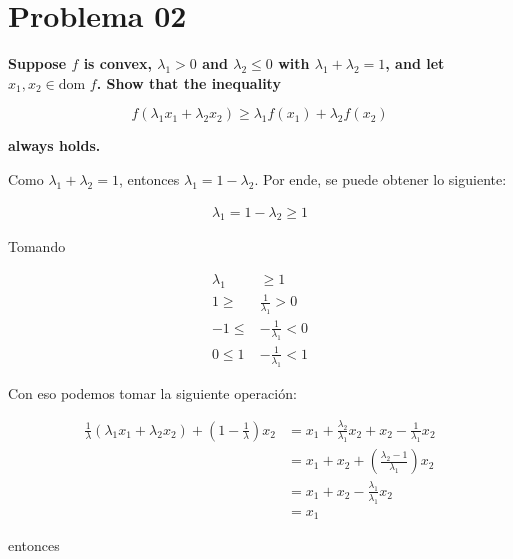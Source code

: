 
\section*{Problema 02}

\textbf{Suppose $f$ is convex, $\lambda_1 >0$ and $\lambda_2 \leq 0$ with $\lambda_1 + \lambda_2 =1$, and let $x_1, x_2 \in \text{dom } f$. Show that the inequality}

\begin{equation*}
    f(\lambda_1 x_1 + \lambda_2 x_2) \geq \lambda_1 f(x_1) + \lambda_2 f(x_2)
\end{equation*}

\textbf{always holds.}

Como $\lambda_1 + \lambda_2 = 1$, entonces $\lambda_1 = 1- \lambda_2$. Por ende, se puede obtener lo siguiente:

\begin{align*}
    \lambda_1 = 1- \lambda_2 \geq 1
\end{align*}

Tomando

\begin{align*}
    \lambda_1 & \geq 1                    \\
    1 \geq    & \frac{1}{\lambda_1} > 0   \\
    -1 \leq   & -\frac{1}{\lambda_1} < 0  \\
    0 \leq  1 & - \frac{1}{\lambda_1} < 1
\end{align*}

Con eso podemos tomar la siguiente operación:

\begin{align*}
    \frac{1}{\lambda} (\lambda_1 x_1 + \lambda_2 x_2) + \left (1-\frac{1}{\lambda} \right ) x_2 & = x_1 + \frac{\lambda_2}{\lambda_1} x_2 + x_2 - \frac{1}{\lambda_1} x_2 \\
                                                                                                & = x_1 +x_2 + \left (\frac{\lambda_2-1}{\lambda_1} \right ) x_2          \\
                                                                                                & = x_1 +x_2 - \frac{\lambda_1}{\lambda_1} x_2                            \\
                                                                                                & = x_1
\end{align*}

entonces

